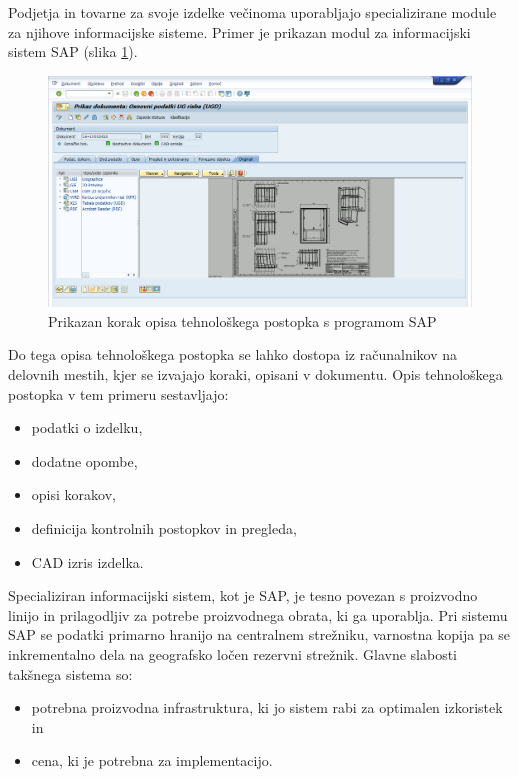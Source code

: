 \documentclass[a4paper, 12pt]{book}
\begin{document}
Podjetja in tovarne za svoje izdelke večinoma uporabljajo specializirane module za njihove informacijske sisteme.
Primer je prikazan modul za informacijski sistem SAP (slika \ref{sap_1}).

\begin{figure}[H]
\begin{center}
\includegraphics[width=13cm]{sap_1}
\end{center}
\caption{Prikazan korak opisa tehnološkega postopka s programom SAP}
\label{sap_1}
\end{figure}

Do tega opisa tehnološkega postopka se lahko dostopa iz računalnikov na delovnih mestih, kjer se izvajajo koraki, opisani v dokumentu.
Opis tehnološkega postopka v tem primeru sestavljajo:
\begin{itemize}
	\item podatki o izdelku,
	\item dodatne opombe,
	\item opisi korakov,
	\item definicija kontrolnih postopkov in pregleda, 
	\item CAD izris izdelka.
\end{itemize}

Specializiran informacijski sistem, kot je SAP, je tesno povezan s proizvodno linijo in prilagodljiv za potrebe proizvodnega obrata, ki ga uporablja.
Pri sistemu SAP se podatki primarno hranijo na centralnem strežniku, varnostna kopija pa se inkrementalno dela na geografsko ločen rezervni strežnik.
Glavne slabosti takšnega sistema so:
\begin{itemize}
	\item potrebna proizvodna infrastruktura, ki jo sistem rabi za optimalen izkoristek in
	\item cena, ki je potrebna za implementacijo.
\end{itemize}
\end{document}
